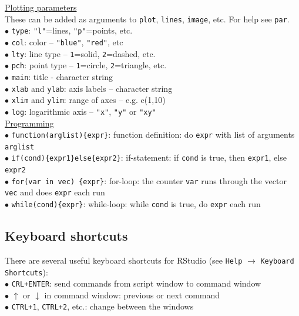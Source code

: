 \documentclass[a4paper,11pt,twocolumn,tablecaptionabove]{scrartcl}
\begin{document}
\noindent \underline{Plotting parameters}\\
These can be added as arguments to \texttt{plot}, \texttt{lines}, \texttt{image}, etc. For help see \texttt{par}.\\
$\bullet$ \texttt{type}: \texttt{"l"}=lines, \texttt{"p"}=points, etc.\\
$\bullet$ \texttt{col}: color -- \texttt{"blue"}, \texttt{"red"}, etc\\
$\bullet$ \texttt{lty}: line type -- \texttt{1}=solid, \texttt{2}=dashed, etc.\\
$\bullet$ \texttt{pch}: point type -- \texttt{1}=circle, \texttt{2}=triangle, etc.\\
$\bullet$ \texttt{main}: title - character string\\
$\bullet$ \texttt{xlab} and \texttt{ylab}: axis labels -- character string\\
$\bullet$ \texttt{xlim} and \texttt{ylim}: range of axes -- e.g. c(1,10)\\ 
$\bullet$ \texttt{log}: logarithmic axis -- \texttt{"x"}, \texttt{"y"} or \texttt{"xy"}\\

\noindent \underline{Programming}\\
$\bullet$ \verb!function(arglist){expr}!: function definition: do \texttt{expr} with list of arguments \texttt{arglist} \\ 
$\bullet$ \verb!if(cond){expr1}else{expr2}!: if-statement: if \texttt{cond} is true, then \texttt{expr1}, else \texttt{expr2} \\
$\bullet$ \verb!for(var in vec) {expr}!: for-loop: the counter \texttt{var} runs through the vector \texttt{vec} and does \texttt{expr} each run\\
$\bullet$ \verb!while(cond){expr}!: while-loop: while \texttt{cond} is true, do \texttt{expr} each run\\

\subsection{Keyboard shortcuts}

There are several useful keyboard shortcuts for RStudio (see \texttt{Help} $\rightarrow$ \texttt{Keyboard Shortcuts}):\\
$\bullet$ \texttt{CRL+ENTER}: send commands from script window to command window\\
$\bullet$ $\uparrow$ or $\downarrow$ in command window: previous or next command\\
$\bullet$ \texttt{CTRL+1}, \texttt{CTRL+2}, etc.: change between the windows\\
\end{document}
